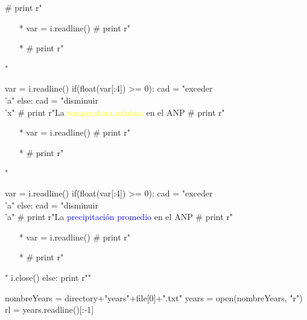 \documentclass{article}
\begin{document}
\begin{python}
{{		      # print r"\begin{itemize}"
		      # print r"\setlength\itemsep{1em}"
		      # print r"\item[*] %
		      var = i.readline()
		      # print r"\item[*] %
		      # print r"\end{itemize}"

		      var = i.readline()
		      if(float(var[:4]) >= 0):
		         cad = "exceder\\'a"
		      else:
		         cad = "disminuir\\'x"
		      # print r"La \textcolor{yellow}{temperatura m\'inima} en el ANP %
		      # print r"\begin{itemize}"
		      # print r"\setlength\itemsep{0em}"
		      # print r"\item[*] %
		      var = i.readline()
		      # print r"\item[*] %
		      # print r"\end{itemize}"

		      var = i.readline()
		      if(float(var[:4]) >= 0):
		         cad = "exceder\\'a"
		      else:
		         cad = "disminuir\\'a"
		      # print r"La \textcolor{blue}{precipitaci\'on promedio} en el ANP %
		      # print r"\begin{itemize}"
		      # print r"\item[*] %
		      var = i.readline()
		      # print r"\item[*] %
		      # print r"\end{itemize}"
		      i.close()
		   else:
		      print r""

		   nombreYears = directory+"years"+file[0]+".txt"
		   years = open(nombreYears, "r")
		   rl = years.readline()[:-1]

}}
\end{python}
\end{document}
